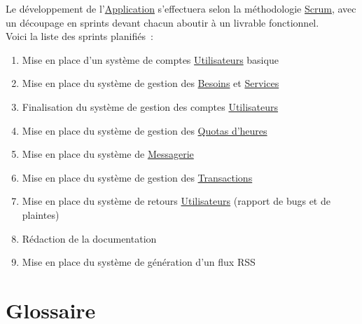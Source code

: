 \documentclass[french,12pt]{article}
\begin{document}
		Le développement de l’\hyperlink{application}{Application} s’effectuera
		 selon la méthodologie
		 \href{https://fr.wikipedia.org/wiki/Scrum_(méthode)}{Scrum}, avec un
		 découpage en sprints devant chacun aboutir à un livrable fonctionnel.\\
		Voici la liste des sprints planifiés :
		\begin{enumerate}
			\item Mise en place d’un système de comptes
			 \hyperlink{utilisateur}{Utilisateurs} basique
			\item Mise en place du système de gestion des \hyperlink{besoin}{Besoins}
			 et \hyperlink{service}{Services}
			\item Finalisation du système de gestion des comptes
			 \hyperlink{utilisateur}{Utilisateurs}
			\item Mise en place du système de gestion des
			 \hyperlink{quota}{Quotas d’heures}
			\item Mise en place du système de \hyperlink{messagerie}{Messagerie}
			\item Mise en place du système de gestion des
			 \hyperlink{transaction}{Transactions}
			\item Mise en place du système de retours
			 \hyperlink{utilisateur}{Utilisateurs} (rapport de bugs et de plaintes)
			\item Rédaction de la documentation
			\item Mise en place du système de génération d’un flux RSS
		\end{enumerate}

	\newpage
	\section{Glossaire}
\end{document}
